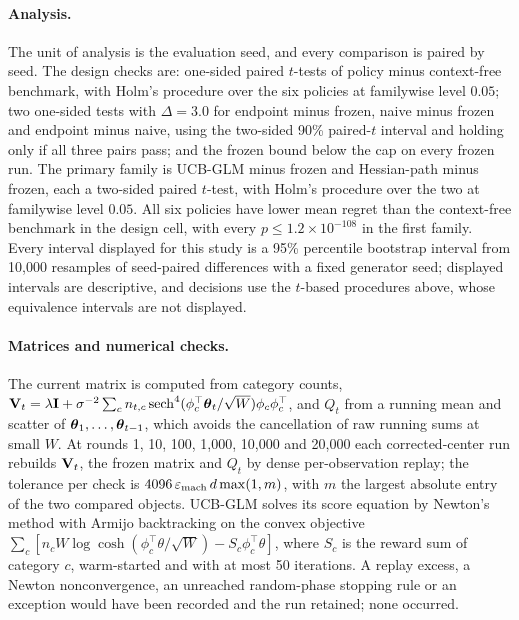 \paragraph{Analysis.}
The unit of analysis is the evaluation seed, and every comparison is paired by
seed. The design checks are: one-sided paired $t$-tests of policy minus
context-free benchmark, with Holm's procedure over the six policies at
familywise level $0.05$; two one-sided tests with $\Delta=3.0$ for endpoint
minus frozen, naive minus frozen and endpoint minus naive, using the
two-sided 90\% paired-$t$ interval and holding only if all three pairs pass;
and the frozen bound below the cap on every frozen run. The primary family is
UCB-GLM minus frozen and Hessian-path minus frozen, each a two-sided paired $t$-test,
with Holm's procedure over the two at familywise level $0.05$. All six
policies have lower mean regret than the context-free benchmark in the design
cell, with every $p\le1.2\times10^{-108}$ in the first family. Every interval
displayed for this study is a 95\% percentile bootstrap interval from 10,000
resamples of seed-paired differences with a fixed generator seed; displayed
intervals are descriptive, and decisions use the $t$-based procedures above,
whose equivalence intervals are not displayed.

\paragraph{Matrices and numerical checks.}
The current matrix is computed from category counts,
$\mathbf{V}_t=\lambda\mathbf{I}+\sigma^{-2}\sum_cn_{t,c}\operatorname{sech}^4
(\phi_c^\top\boldsymbol{\theta}_t/\sqrt W)\phi_c\phi_c^\top$, and $Q_t$ from a running mean
and scatter of $\boldsymbol{\theta}_1,\ldots,\boldsymbol{\theta}_{t-1}$, which avoids the cancellation
of raw running sums at small $W$. At rounds 1, 10, 100, 1,000, 10,000 and
20,000 each corrected-center run rebuilds $\mathbf{V}_t$, the frozen matrix and $Q_t$
by dense per-observation replay; the tolerance per check is
$4096\,\varepsilon_{\rm mach}\,d\max(1,m)$, with $m$ the largest absolute entry
of the two compared objects. UCB-GLM solves its score equation by Newton's
method with Armijo backtracking on the convex objective
$\sum_c[n_cW\log\cosh(\phi_c^\top\theta/\sqrt W)-S_c\phi_c^\top\theta]$, where
$S_c$ is the reward sum of category $c$, warm-started and with at most 50
iterations. A replay excess, a Newton nonconvergence, an unreached random-phase
stopping rule or an exception would have been recorded and the run retained;
none occurred.

